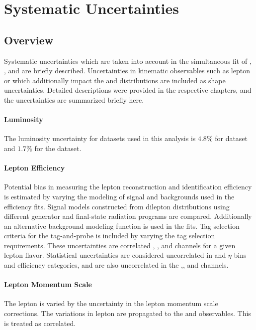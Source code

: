 \chapter{Systematic Uncertainties}\label{ch:systematics}

\section{Overview}
Systematic uncertainties which are taken into account in the simultaneous fit of \Wp, \Wm, and \Z are briefly described. Uncertainties in kinematic observables such as lepton \pt or \met which additionally impact the \mt and \mll distributions are included as shape uncertainties. Detailed descriptions were provided in the respective chapters, and the uncertainties are summarized briefly here.

\subsubsection{Luminosity}
The luminosity uncertainty for datasets used in this analysis is $4.8\%$ for \serag dataset and $1.7\%$ for the \serah dataset. 

\subsubsection{Lepton Efficiency}
Potential bias in measuring the lepton reconstruction and identification efficiency is estimated by varying the modeling of signal and backgrounds used in the efficiency  fits. Signal models constructed from dilepton \mll distributions using different generator and final-state radiation programs are compared. Additionally an alternative background modeling function is used in the fits. Tag selection criteria for the tag-and-probe is included by varying the tag selection requirements. These uncertainties are correlated \Wp, \Wm, and \Z channels for a given lepton flavor. Statistical uncertainties are considered uncorrelated in \pt and $\eta$ bins and efficiency categories, and are also uncorrelated in the \Wp,\Wm, and \Z channels.

\subsubsection{Lepton Momentum Scale}
The lepton \pt is varied by the uncertainty in the lepton momentum scale corrections. The variations in lepton \pt are propagated to the \mt and \mll observables. This is treated as correlated.

